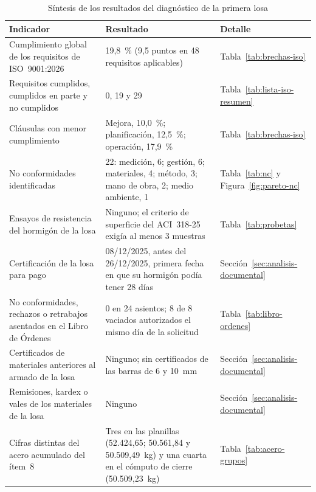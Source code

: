 \begin{table}[H]
\caption{Síntesis de los resultados del diagnóstico de la primera losa}
\label{tab:sintesis-diagnostico}
\setlength{\tabcolsep}{4pt}
\begin{tabularx}{\linewidth}{@{}P{5.2cm}LP{2.9cm}@{}}
\toprule
\textbf{Indicador} & \textbf{Resultado} & \textbf{Detalle} \\
\midrule
Cumplimiento global de los requisitos de ISO~9001:2026 & 19,8~\% (9,5 puntos en 48 requisitos aplicables) & Tabla~\ref{tab:brechas-iso} \\
Requisitos cumplidos, cumplidos en parte y no cumplidos & 0, 19 y 29 & Tabla~\ref{tab:lista-iso-resumen} \\
Cláusulas con menor cumplimiento & Mejora, 10,0~\%; planificación, 12,5~\%; operación, 17,9~\% & Tabla~\ref{tab:brechas-iso} \\
No conformidades identificadas & 22: medición, 6; gestión, 6; materiales, 4; método, 3; mano de obra, 2; medio ambiente, 1 & Tabla~\ref{tab:nc} y Figura~\ref{fig:pareto-nc} \\
Ensayos de resistencia del hormigón de la losa & Ninguno; el criterio de superficie del ACI~318-25 exigía al menos 3 muestras & Tabla~\ref{tab:probetas} \\
Certificación de la losa para pago & 08/12/2025, antes del 26/12/2025, primera fecha en que su hormigón podía tener 28 días & Sección~\ref{sec:analisis-documental} \\
No conformidades, rechazos o retrabajos asentados en el Libro de Órdenes & 0 en 24 asientos; 8 de 8 vaciados autorizados el mismo día de la solicitud & Tabla~\ref{tab:libro-ordenes} \\
Certificados de materiales anteriores al armado de la losa & Ninguno; sin certificados de las barras de 6 y 10~mm & Sección~\ref{sec:analisis-documental} \\
Remisiones, kardex o vales de los materiales de la losa & Ninguno & Sección~\ref{sec:analisis-documental} \\
Cifras distintas del acero acumulado del ítem~8 & Tres en las planillas (52.424,65; 50.561,84 y 50.509,49~kg) y una cuarta en el cómputo de cierre (50.509,23~kg) & Tabla~\ref{tab:acero-grupos} \\
\bottomrule
\end{tabularx}
\end{table}

